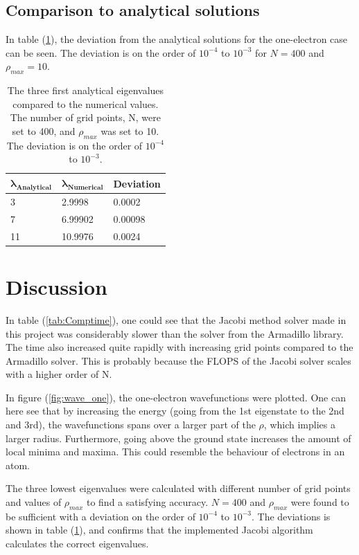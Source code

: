 \documentclass[10pt,a4paper,titlepage]{article}
\begin{document}
\subsection{Comparison to analytical solutions}
In table (\ref{tab:Analytical_vs}), the deviation from the analytical solutions for the one-electron case can be seen. The deviation is on the order of $10^{-4}$ to $10^{-3}$ for $N = 400$ and $\rho_{max} = 10$.

\begin{table}[]
\centering
\caption{The three first analytical eigenvalues compared to the numerical values.  The number of grid points, N, were set to 400, and $\rho_{max}$ was set to 10. The deviation is on the order of $10^{-4}$ to $10^{-3}$.}
\label{tab:Analytical_vs}
\begin{tabular}{|l|l|l|}
\hline
$\mathbf{\lambda_{Analytical}}$    & $\mathbf{\lambda_{Numerical}}$ &\bf Deviation\\ \hline
3   & 2.9998       & 0.0002\\ \hline
7  & 6.99902        &  0.00098\\ \hline
11 & 10.9976        &  0.0024\\ \hline
\end{tabular}
\end{table}



\section{Discussion}
In table (\ref{tab:Comptime}), one could see that the Jacobi method solver made in this project was considerably slower than the solver from the Armadillo library. The time also increased quite rapidly with increasing grid points compared to the Armadillo solver. This is probably because the FLOPS of the Jacobi solver scales with a higher order of N. 

In figure (\ref{fig:wave_one}), the one-electron wavefunctions were plotted. One can here see that by increasing the energy (going from the 1st eigenstate to the 2nd and 3rd), the wavefunctions spans over a larger part of the $\rho$, which implies a larger radius. Furthermore, going above the ground state increases the amount of local minima and maxima. This could resemble the behaviour of electrons in an atom. 

The three lowest eigenvalues were calculated with different number of grid points and values of $\rho_{max}$ to find a satisfying accuracy. $N=400$ and $\rho_{max}$ were found to be sufficient with a deviation on the order of $10^{-4}$ to $10^{-3}$. The deviations is shown in table (\ref{tab:Analytical_vs}), and confirms that the implemented Jacobi algorithm calculates the correct eigenvalues. 
\end{document}
